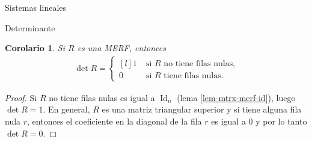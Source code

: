 \documentclass[a4paper,12pt,twoside,spanish,reqno]{amsbook}
\newtheorem{corolario}[teorema]{Corolario}
\theoremstyle{definition}
\theoremstyle{remark}
\newcommand{\Id}{\operatorname{Id}}
\begin{document}
\begin{chapter}{Sistemas lineales}
\begin{section}{Determinante}
    \begin{corolario}\label{cor-det-merf}
        Si $R$ es una MERF, entonces 
        \begin{align*}
        \det R = \left\{ \begin{matrix*}[l]
        1 \;&\text{si $R$ no tiene filas nulas,}\\
        0&\text{si $R$ tiene filas nulas.}
        \end{matrix*}\right.  
        \end{align*}
    \end{corolario}
    \begin{proof}
        Si $R$ no tiene filas nulas es igual a $\Id_n$ (lema \ref{lem-mtrx-merf-id}), luego $\det R = 1$. En general, $R$ es una matriz triangular superior y si tiene alguna fila nula $r$, entonces el coeficiente en la diagonal de la fila $r$ es igual a $0$ y por lo tanto 	$\det R = 0$.
    \end{proof}


\end{section}
\end{chapter}
\end{document}

